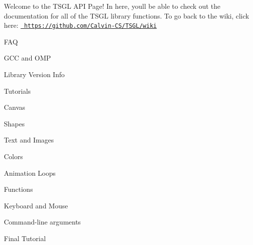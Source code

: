Welcome to the T\+S\+GL A\+PI Page! In here, you\textquotesingle{}ll be able to check out the documentation for all of the T\+S\+GL library functions. To go back to the wiki, click here\+: \href{https://github.com/Calvin-CS/TSGL/wiki}{\texttt{ https\+://github.\+com/\+Calvin-\/\+C\+S/\+T\+S\+G\+L/wiki}}
\begin{DoxyItemize}
\item F\+AQ
\item G\+CC and O\+MP
\item Library Version Info
\item Tutorials
\begin{DoxyItemize}
\item Canvas
\item Shapes
\item Text and Images
\item Colors
\item Animation Loops
\item Functions
\item Keyboard and Mouse
\item Command-\/line arguments
\item Final Tutorial
\end{DoxyItemize}
\end{DoxyItemize}